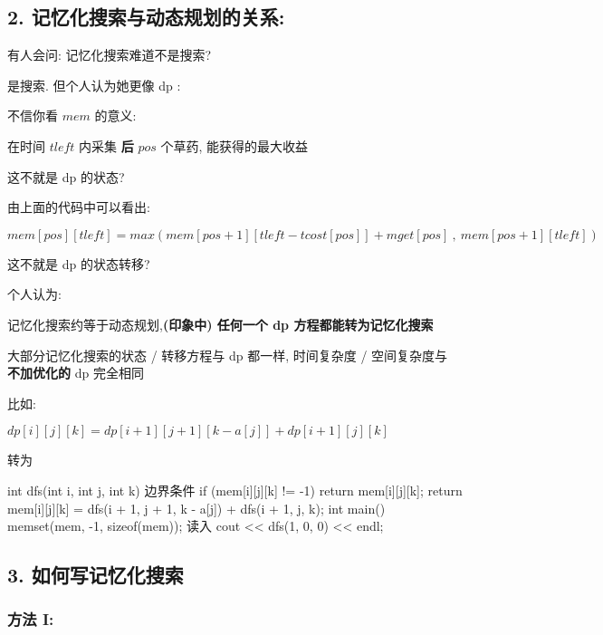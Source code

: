 \hr

\subsection{2. 记忆化搜索与动态规划的关系:}

有人会问: 记忆化搜索难道不是搜索?

是搜索. 但个人认为她更像 dp :

不信你看 $mem$ 的意义:

\begin{QUOTE}{}{}
在时间 $tleft$ 内采集 \textbf{ 后 } $pos$ 个草药, 能获得的最大收益
\end{QUOTE}

这不就是 dp 的状态?

由上面的代码中可以看出:

\begin{QUOTE}{}{}
$mem[pos][tleft] = max(mem[pos+1][tleft-tcost[pos]]+mget[pos]\ ,\ mem[pos+1][tleft])$
\end{QUOTE}

这不就是 dp 的状态转移?

个人认为:

\begin{QUOTE}{}{}
记忆化搜索约等于动态规划,\textbf{(印象中) 任何一个 dp 方程都能转为记忆化搜索 }
\end{QUOTE}

大部分记忆化搜索的状态 / 转移方程与 dp 都一样, 时间复杂度 / 空间复杂度与 \textbf{ 不加优化的 } dp 完全相同

比如:

$dp[i][j][k] = dp[i+1][j+1][k-a[j]] + dp[i+1][j][k]$

转为

\begin{cppcode}
int dfs(int i, int j, int k) {
  边界条件
  if (mem[i][j][k] != -1) return mem[i][j][k];
  return mem[i][j][k] = dfs(i + 1, j + 1, k - a[j]) + dfs(i + 1, j, k);
}
int main() {
  memset(mem, -1, sizeof(mem));
  读入
  cout << dfs(1, 0, 0) << endl;
}
\end{cppcode}

\hr

\subsection{3. 如何写记忆化搜索}

\subsubsection{方法 I:}


